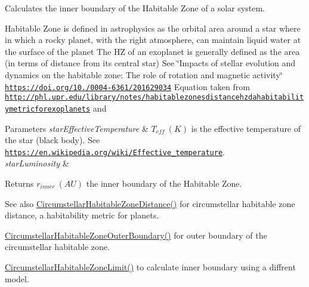 Calculates the inner boundary of the Habitable Zone of a solar system. 

Habitable Zone is defined in astrophysics as the orbital area around a star where in which a rocky planet, with the right atmosphere, can maintain liquid water at the surface of the planet The HZ of an exoplanet is generally defined as the area (in terms of distance from its central star) See \char`\"{}\+Impacts of stellar evolution and dynamics on the habitable zone\+: The role of rotation and magnetic activity\char`\"{} \href{https://doi.org/10.1051/0004-6361/201629034}{\tt https\+://doi.\+org/10./0004-\/6361/201629034} Equation taken from \href{http://phl.upr.edu/library/notes/habitablezonesdistancehzdahabitabilitymetricforexoplanets}{\tt http\+://phl.\+upr.\+edu/library/notes/habitablezonesdistancehzdahabitabilitymetricforexoplanets} and 
\begin{DoxyParams}{Parameters}
{\em star\+Effective\+Temperature} & $T_{eff}\ (K)$ is the effective temperature of the star (black body). See \href{https://en.wikipedia.org/wiki/Effective_temperature}{\tt https\+://en.\+wikipedia.\+org/wiki/\+Effective\+\_\+temperature}. \\
\hline
{\em star\+Luminosity} & \\
\hline
\end{DoxyParams}
\begin{DoxyReturn}{Returns}
$r_{inner}\ (AU)$ the inner boundary of the Habitable Zone. 
\end{DoxyReturn}
\begin{DoxySeeAlso}{See also}
\hyperlink{group___astrophysics_gacf3a720793cdb27f6d93b170b44e81be}{Circumstellar\+Habitable\+Zone\+Distance()} for circumstellar habitable zone distance, a habitability metric for planets. 

\hyperlink{group___astrophysics_gaa47fcde814ba8007de800e930fc0a08d}{Circumstellar\+Habitable\+Zone\+Outer\+Boundary()} for outer boundary of the circumstellar habitable zone. 

\hyperlink{group___astrophysics_ga23a8f602461ea3257e8767b1d455c383}{Circumstellar\+Habitable\+Zone\+Limit()} to calculate inner boundary using a diffrent model. 
\end{DoxySeeAlso}
\mbox{\label{group___astrophysics_ga23a8f602461ea3257e8767b1d455c383}} 
